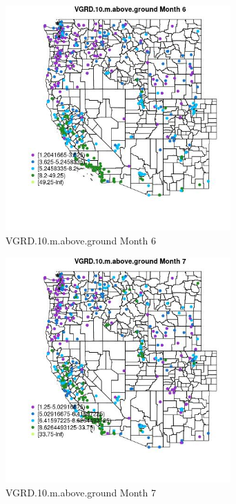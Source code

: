 \begin{figure} 
\centering  
\includegraphics[width=0.77\textwidth]{Code_Outputs/ML_input_report_ML_input_PM25_Step5_part_d_de_duplicated_aves_ML_input_MapObsMo6VGRD10maboveground.jpg} 
\caption{\label{fig:ML_input_report_ML_input_PM25_Step5_part_d_de_duplicated_aves_ML_inputMapObsMo6VGRD10maboveground}VGRD.10.m.above.ground Month 6} 
\end{figure} 
 

\begin{figure} 
\centering  
\includegraphics[width=0.77\textwidth]{Code_Outputs/ML_input_report_ML_input_PM25_Step5_part_d_de_duplicated_aves_ML_input_MapObsMo7VGRD10maboveground.jpg} 
\caption{\label{fig:ML_input_report_ML_input_PM25_Step5_part_d_de_duplicated_aves_ML_inputMapObsMo7VGRD10maboveground}VGRD.10.m.above.ground Month 7} 
\end{figure} 
 

